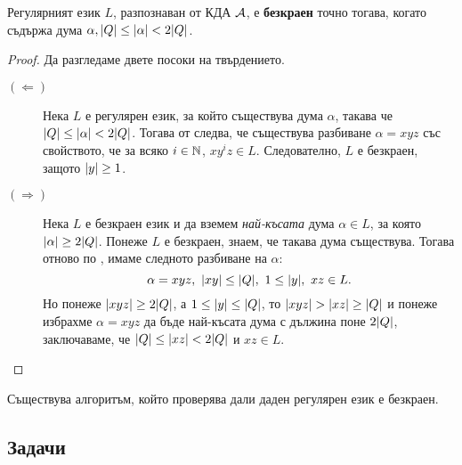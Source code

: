 \begin{prop}
  Регулярният език $L$, 
  разпознаван от КДА $\mathcal{A}$, е {\bf безкраен} точно тогава, когато съдържа дума $\alpha, \lvert{Q}\rvert \leq \lvert{\alpha}\rvert < 2\lvert{Q}\rvert$.
\end{prop}
\begin{proof}
  Да разгледаме двете посоки на твърдението.
  \begin{description}
  \item[$(\Leftarrow)$]
    Нека $L$ е регулярен език, за който съществува дума $\alpha$, такава че $\lvert{Q}\rvert \leq \lvert{\alpha}\rvert < 2\lvert{Q}\rvert$.
    Тогава от  следва, че съществува разбиване $\alpha = xyz$ със свойството, че
    за всяко $i \in \mathbb{N}$, $xy^iz \in L$. Следователно, $L$ е безкраен, защото $\lvert{y}\rvert \geq 1$.
  \item[$(\Rightarrow)$]
    Нека $L$ е безкраен език и %
    да вземем {\em най-късата} дума $\alpha \in L$, за която $\lvert{\alpha}\rvert \geq 2\lvert{Q}\rvert$.
    Понеже $L$ е безкраен, знаем, че такава дума съществува.
    Тогава отново по , имаме следното разбиване на $\alpha$:
    \[\alpha = xyz,\ \abs{xy} \leq \abs{Q},\ 1\leq \abs{y},\ xz \in L.\]
    Но понеже $\lvert{xyz}\rvert \geq 2\lvert{Q}\rvert$, а $1 \leq \lvert{y}\rvert \leq \lvert{Q}\rvert$, то $\lvert{xyz}\rvert > \lvert{xz}\rvert \geq \lvert{Q}\rvert$ и понеже избрахме $\alpha = xyz$
    да бъде най-късата дума с дължина поне $2\lvert{Q}\rvert$, заключаваме, че $\lvert{Q}\rvert \leq \lvert{xz}\rvert < 2\lvert{Q}\rvert$ и $xz \in L$.
  \end{description}
\end{proof}

\begin{cor}
  Съществува алгоритъм, който проверява дали даден регулярен език е безкраен.
\end{cor}

\subsection{Задачи}

